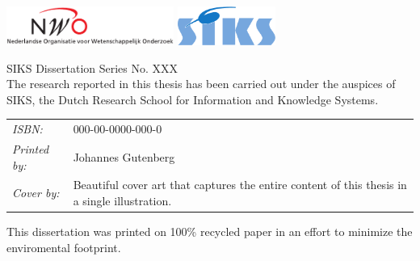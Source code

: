 \begin{titlepage}
                \vspace*{\fill}

               	\begin{center}
                        \includegraphics[height=0.5in]{FrontMatter/Logos/nwo}
                        \hspace{2em}
                        \includegraphics[height=0.5in]{FrontMatter/Logos/sikskleur}
                \end{center}
                \medskip

                \noindent SIKS Dissertation Series No. XXX \\
                The research reported in this thesis has been carried out under the auspices of SIKS, the Dutch Research School for Information and Knowledge Systems.

             	\vspace{\bigskipamount}

               	\noindent
               	\begin{tabular}{@{}p{}@{}p{}}
          		\textit{ISBN:} &  000-00-0000-000-0 \\[\medskipamount]
                	\textit{Printed by:} & Johannes Gutenberg \\[\medskipamount]
                	\textit{Cover by:} & Beautiful cover art that captures the entire content of this thesis in a single illustration.
                \end{tabular}

                \medskip

                \noindent This dissertation was printed on 100\% recycled paper in an effort to minimize the enviromental footprint.


\end{titlepage}

